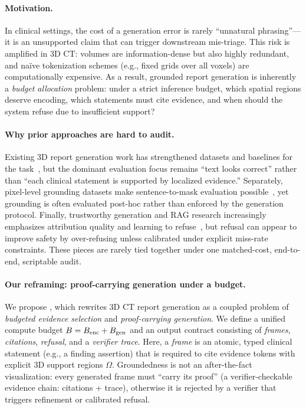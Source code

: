 \paragraph{Motivation.}
In clinical settings, the cost of a generation error is rarely ``unnatural phrasing''---it is an unsupported claim that can trigger downstream mis-triage.
This risk is amplified in 3D CT: volumes are information-dense but also highly redundant, and na\"ive tokenization schemes (e.g., fixed grids over all voxels) are computationally expensive.
As a result, grounded report generation is inherently a \emph{budget allocation} problem: under a strict inference budget, which spatial regions deserve encoding, which statements must cite evidence, and when should the system refuse due to insufficient support?

\paragraph{Why prior approaches are hard to audit.}
Existing 3D report generation work has strengthened datasets and baselines for the task~\citep{hamamci2024developing,hamamci2024ct2rep,hamamci2023generatect}, but the dominant evaluation focus remains ``text looks correct'' rather than ``each clinical statement is supported by localized evidence.''
Separately, pixel-level grounding datasets make sentence-to-mask evaluation possible~\citep{baharoon2025rexgroundingct}, yet grounding is often evaluated post-hoc rather than enforced by the generation protocol.
Finally, trustworthy generation and RAG research increasingly emphasizes attribution quality and learning to refuse~\citep{song2024trustalign}, but refusal can appear to improve safety by over-refusing unless calibrated under explicit miss-rate constraints.
These pieces are rarely tied together under one matched-cost, end-to-end, scriptable audit.

\paragraph{Our reframing: proof-carrying generation under a budget.}
We propose \ProveTok, which rewrites 3D CT report generation as a coupled problem of \emph{budgeted evidence selection} and \emph{proof-carrying generation}.
We define a unified compute budget $B=B_{\mathrm{enc}}+B_{\mathrm{gen}}$ and an output contract consisting of \emph{frames}, \emph{citations}, \emph{refusal}, and a \emph{verifier trace}.
Here, a \emph{frame} is an atomic, typed clinical statement (e.g., a finding assertion) that is required to cite evidence tokens with explicit 3D support regions $\Omega$.
Groundedness is not an after-the-fact visualization: every generated frame must ``carry its proof'' (a verifier-checkable evidence chain: citations + trace), otherwise it is rejected by a verifier that triggers refinement or calibrated refusal.

